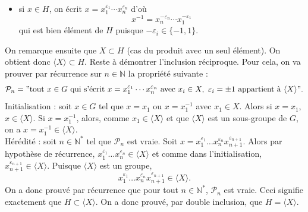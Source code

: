 \documentclass[11pt,a4paper]{article}
\newcommand{\veps}{\varepsilon}\newcommand{\mcu}{\mathcal{U}}
\begin{document}
\begin{corrige}
\begin{enumerate}
\begin{itemize}
				\item  si $x\in H$, on écrit $x=x_1^{\veps_1}\cdots x_n^{\veps_n}$ d'où
				$$x^{-1}=x_n^{-\veps_n}\cdots x_1^{-\veps_1}$$
				qui est bien élément de $H$ puisque $-\veps_i\in\{-1,1\}$.
				
			\end{itemize}
			
			On remarque ensuite que $X\subset H$ (cas du produit avec un seul élément). On obtient donc $\langle X\rangle \subset H$. Reste à démontrer l'inclusion réciproque. Pour cela, on va prouver par récurrence sur $n\in\mathbb N$ la propriété suivante :
			$$\mathcal P_n="\textrm{tout }x\in G\textrm{ qui s'écrit }x=x_1^{\veps_1}\cdots x_n^{\veps_n}\textrm{ avec }x_i\in X,\ \veps_i=\pm 1\textrm{ appartient à }\langle X\rangle".$$
			Initialisation : soit $x\in G$ tel que $x=x_1$ ou $x=x_1^{-1}$ avec $x_1\in X$. Alors si $x=x_1$, $x\in \langle X\rangle$. Si $x=x_1^{-1}$, alors, comme $x_1\in\langle X\rangle$ et que $\langle X\rangle$ est un sous-groupe de $G$, on a $x=x_1^{-1}\in \langle X\rangle$.\\
			
			Hérédité : soit $n\in\mathbb N^*$ tel que $\mathcal P_n$ est vraie. Soit $x=x_1^{\veps_1}\dots x_n^{\veps_n}x_{n+1}^{\veps_{n+1}}.$ Alors
			par hypothèse de récurrence, $x_1^{\veps_1}\dots x_n^{\veps_n}\in \langle X\rangle$ et comme dans l'initialisation, $x_{n+1}^{\veps_{n+1}}\in\langle X\rangle$. Puisque $\langle X\rangle$ est un groupe, 
			$$x_1^{\veps_1}\dots x_n^{\veps_n}x_{n+1}^{\veps_{n+1}}\in\langle X\rangle.$$
			On a donc prouvé par récurrence que pour tout $n\in\mathbb N^*$, $\mathcal P_n$ est vraie. Ceci signifie exactement que $H\subset\langle X\rangle$. On a donc prouvé, par double inclusion, que $H=\langle X\rangle$.
			
		\end{enumerate}
	\end{corrige}
	
\end{document}
